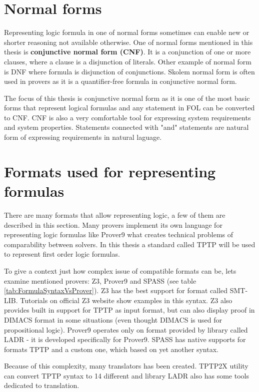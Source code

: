 \section{Normal forms}

Representing logic formula in one of normal forms sometimes can enable new or shorter reasoning not available otherwise. One of normal forms mentioned in this thesis is \textbf{conjunctive normal form (CNF)}. It is a conjunction of one or more clauses, where a clause is a disjunction of literals. Other example of normal form is \gls{DNF} where formula is disjunction of conjunctions. Skolem normal form is often used in provers as it is a quantifier-free formula in conjunctive normal form.

The focus of this thesis is conjunctive normal form as it is one of the most basic forms that represent logical formulas and any statement in \gls{FOL} can be converted to CNF. CNF is also a very comfortable tool for expressing system requirements and system properties. 
Statements connected with "and" statements are natural form of expressing requirements in natural laguage.

\section{Formats used for representing formulas}

There are many formats that allow representing logic, a few of them are described in this section. Many provers implement its own language for representing logic formulas like Prover9 what creates technical problems of comparability between solvers. In this thesis a standard called \gls{TPTP} will be used to represent first order logic formulas. 

To give a context just how complex issue of compatible formats can be, lets examine mentioned provers: Z3, Prover9 and SPASS (see table \ref{tab:FormulaSyntaxVsProver}). Z3 has the best support for format called SMT-LIB. Tutorials on official Z3 website show examples in this syntax. Z3 also provides built in support for TPTP as input format, but can also display proof in DIMACS format in some situations (even thought DIMACS is used for propositional logic). Prover9 operates only on format provided by library called LADR - it is developed specifically for Prover9. SPASS has native supports for formats TPTP and a custom one, which based on yet another syntax. 

Because of this complexity, many translators has been created. TPTP2X utility can convert TPTP syntax to 14 different and library LADR also has some tools dedicated to translation.

